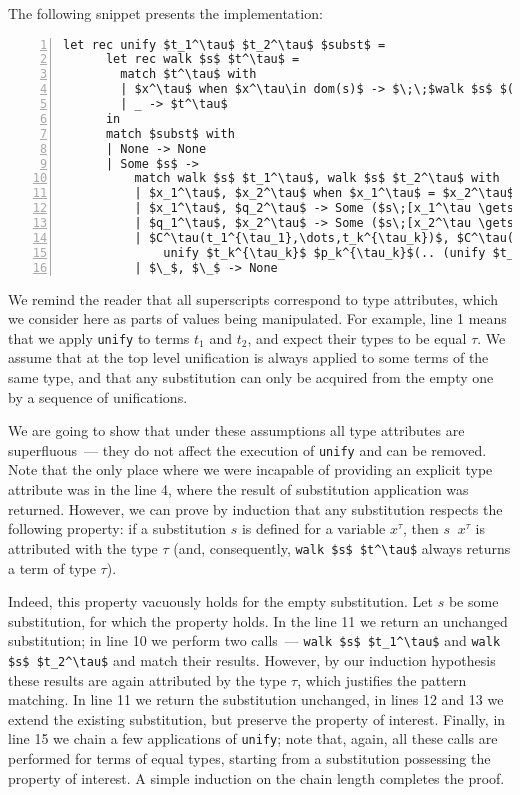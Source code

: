 The following snippet presents the implementation:

\begin{lstlisting}[mathescape=true,numbers=left,numberstyle=\small,stepnumber=1,numbersep=-5pt]
    let rec unify $t_1^\tau$ $t_2^\tau$ $subst$ =
      let rec walk $s$ $t^\tau$ =
        match $t^\tau$ with
        | $x^\tau$ when $x^\tau\in dom(s)$ -> $\;\;$walk $s$ $(s\;\;x^\tau)$
        | _ -> $t^\tau$
      in
      match $subst$ with
      | None -> None
      | Some $s$ ->
          match walk $s$ $t_1^\tau$, walk $s$ $t_2^\tau$ with
          | $x_1^\tau$, $x_2^\tau$ when $x_1^\tau$ = $x_2^\tau$ -> $subst$
          | $x_1^\tau$, $q_2^\tau$ -> Some ($s\;[x_1^\tau \gets q_2^\tau]$)
          | $q_1^\tau$, $x_2^\tau$ -> Some ($s\;[x_2^\tau \gets q_1^\tau]$)
          | $C^\tau(t_1^{\tau_1},\dots,t_k^{\tau_k})$, $C^\tau(p_1^{\tau_1},\dots,p_k^{\tau_k})$ ->
              unify $t_k^{\tau_k}$ $p_k^{\tau_k}$(.. (unify $t_1^{\tau_1}$ $p_1^{\tau_1}$ $subst$)$..$)
          | $\_$, $\_$ -> None
\end{lstlisting}

We remind the reader that all superscripts correspond to type attributes, which we consider here as
parts of values being manipulated. For example, line 1 means that we apply \lstinline{unify}
to terms $t_1$ and $t_2$, and expect their types to be equal $\tau$. We assume that
at the top level unification is always applied to some terms of the same type, and that any
substitution can only be acquired from the empty one by a sequence of unifications.

We are going to show that under these assumptions all type attributes are superfluous~--- they
do not affect the execution of \lstinline{unify} and can be removed. Note that the only place where we
were incapable of providing an explicit type attribute was in the line 4, where the result of
substitution application was returned. However, we can prove by induction that any substitution
respects the following property: if a substitution $s$ is defined for a variable $x^\tau$,
then $s\;\;x^\tau$ is attributed with the type $\tau$ (and, consequently, \lstinline{walk $s$ $t^\tau$} always
returns a term of type $\tau$).

Indeed, this property vacuously holds for the empty substitution. Let $s$ be some substitution, for which the
property holds. In the line 11 we return an unchanged substitution; in line 10 we perform two calls~---
\lstinline{walk $s$ $t_1^\tau$} and \lstinline{walk $s$ $t_2^\tau$} and match their results. However,
by our induction hypothesis these results are again attributed by the type $\tau$, which justifies the
pattern matching. In line 11 we return the substitution unchanged, in lines 12 and 13 we extend the
existing substitution, but preserve the property of interest. Finally, in line 15 we chain a few
applications of \lstinline{unify}; note that, again, all these calls are performed for terms of equal
types, starting from a substitution possessing the property of interest. A simple induction on the
chain length completes the proof.

